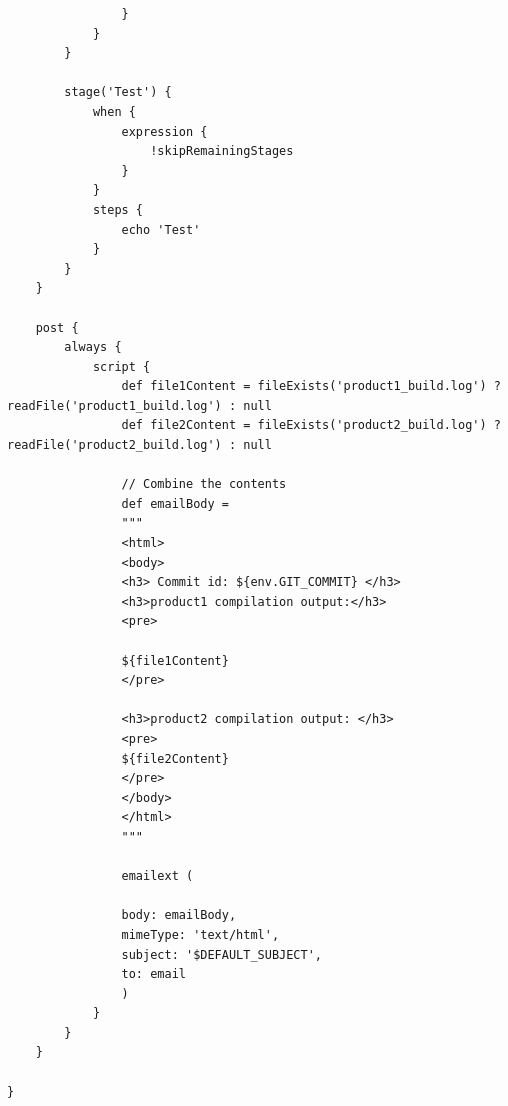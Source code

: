 \documentclass[paper=8.5in:11in, twoside, 12pt, pagesize=pdftex]{book}
\begin{document}
\begin{lstlisting}
				}
			}
		}
		
		stage('Test') {
			when {
				expression {
					!skipRemainingStages
				}
			}
			steps {
				echo 'Test'
			}
		} 
	}
	
	post { 
		always {  
			script {
				def file1Content = fileExists('product1_build.log') ? readFile('product1_build.log') : null
				def file2Content = fileExists('product2_build.log') ? readFile('product2_build.log') : null   
				
				// Combine the contents
				def emailBody = 
				"""
				<html>
				<body>
				<h3> Commit id: ${env.GIT_COMMIT} </h3> 
				<h3>product1 compilation output:</h3>
				<pre>
				
				${file1Content}
				</pre>
				
				<h3>product2 compilation output: </h3> 
				<pre>  
				${file2Content}
				</pre>    
				</body>
				</html>    
				"""    
				
				emailext (
				
				body: emailBody,
				mimeType: 'text/html',
				subject: '$DEFAULT_SUBJECT',
				to: email
				)
			}
		}  
	} 
	
}
\end{lstlisting}
\end{document}
